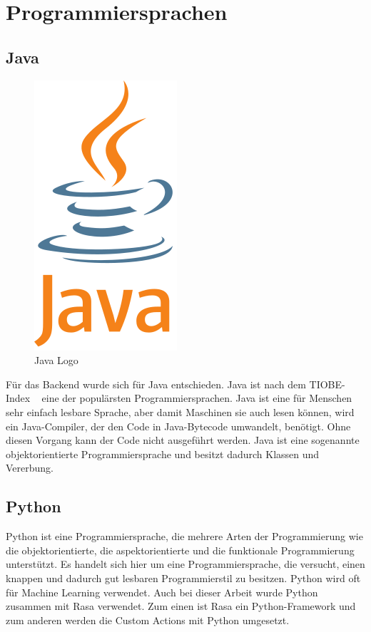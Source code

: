 \section{Programmiersprachen}

\subsection{Java}

\begin{figure}[hbt!]
    \centering
    \includegraphics[scale=0.5]{pics/java}
    \caption{Java Logo\cite{java}}
    \label{fig:impl:java}
\end{figure}

Für das Backend wurde sich für Java entschieden.
Java ist nach dem TIOBE-Index ~\cite{tiobe} eine der populärsten Programmiersprachen.
Java ist eine für Menschen sehr einfach lesbare Sprache, aber damit Maschinen sie auch lesen können, wird ein Java-Compiler, der den Code in Java-Bytecode umwandelt, benötigt.
Ohne diesen Vorgang kann der Code nicht ausgeführt werden.
Java ist eine sogenannte objektorientierte Programmiersprache und besitzt dadurch Klassen und Vererbung\cite{java}.

\subsection{Python}

Python ist eine Programmiersprache, die mehrere Arten der Programmierung wie die objektorientierte, die aspektorientierte und die funktionale Programmierung unterstützt.
Es handelt sich hier um eine Programmiersprache, die versucht, einen knappen und dadurch gut lesbaren Programmierstil zu besitzen.
Python wird oft für Machine Learning verwendet.
Auch bei dieser Arbeit wurde Python zusammen mit Rasa verwendet.
Zum einen ist Rasa ein Python-Framework und zum anderen werden die Custom Actions mit Python umgesetzt.

